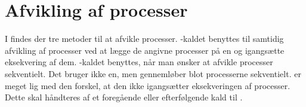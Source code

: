\section{Afvikling af processer}
I \pycsp findes der tre metoder til at afvikle processer. -kaldet benyttes til samtidig afvikling af processer ved at lægge de angivne processer på \sched en og igangsætte eksekvering af dem. -kaldet benyttes, når man ønsker at afvikle processer sekventielt. Det bruger ikke \sched en, men gennemløber blot processerne sekventielt.  er meget lig  med den forskel, at den ikke igangsætter eksekveringen af processer. Dette skal håndteres af et foregående eller efterfølgende kald til . 

